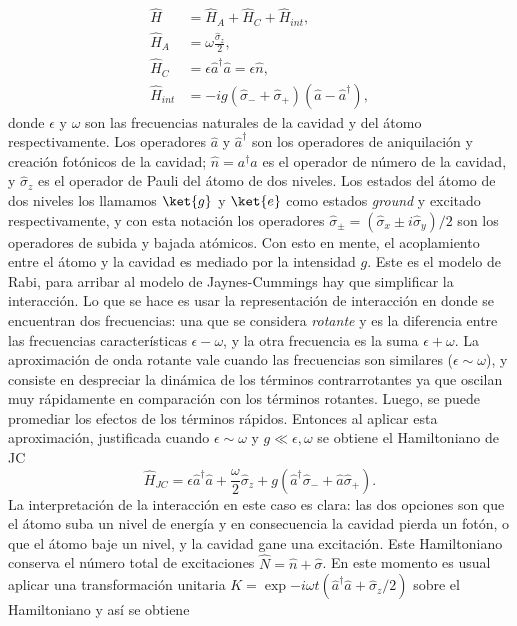 \begin{equation}\label{ec3:hamiltoniano inicial}
\begin{aligned}
    \hat H & = \hat H_A + \hat H_C + \hat H_{int},  \\
    \hat H_A &= \omega \frac{\hat \sigma_z}{2}, \\
    \hat H_C &= \epsilon \hat a^\dagger\hat a = \epsilon \hat n, \\
    \hat H_{int} &= -i g (\hat\sigma_-+\hat \sigma_+)(\hat a - \hat a^\dagger),
\end{aligned}
\end{equation}
donde $\epsilon$ y $\omega$ son las frecuencias naturales de la cavidad y del átomo respectivamente. Los operadores $\hat a$ y $\hat a^\dagger$ son los operadores de aniquilaci\'on y creaci\'on fot\'onicos de la cavidad; $\hat n =a^\dagger a$ es el operador de n\'umero de la cavidad, y $\hat \sigma_z$ es el operador de Pauli del átomo de dos niveles. Los estados del átomo de dos niveles los llamamos $\ket{g}$ y $\ket{e}$ como estados \textit{ground} y excitado respectivamente, y con esta notación los operadores $\hat\sigma_\pm = (\hat\sigma_x\pm i\hat\sigma_y)/2$ son los operadores de subida y bajada atómicos. Con esto en mente, el acoplamiento entre el átomo y la cavidad es mediado por la intensidad $g$. Este es el modelo de Rabi, para arribar al modelo de Jaynes-Cummings hay que simplificar la interacción. Lo que se hace es usar la representaci\'on de interacci\'on en donde se encuentran dos frecuencias: una que se considera \textit{rotante} y es la diferencia entre las frecuencias características $\epsilon-\omega$, y la otra frecuencia es la suma $\epsilon+\omega$. La aproximación de onda rotante vale cuando las frecuencias son similares ($\epsilon\sim\omega$), y consiste en despreciar la dinámica de los términos contrarrotantes ya que oscilan muy rápidamente en comparación con los términos rotantes. Luego, se puede promediar los efectos de los términos rápidos. Entonces al aplicar esta aproximación, justificada cuando $\epsilon\sim\omega$ y $g \ll \epsilon,\omega$ se obtiene el Hamiltoniano de JC \cite{JCoriginal}
\begin{equation}
    \hat H_{JC}=\epsilon \hat a^\dagger \hat a + \frac{\omega}{2} \hat\sigma_z + g(\hat a^\dagger\hat\sigma_-+\hat a\hat\sigma_+).
\end{equation} 
La interpretaci\'on de la interacci\'on en este caso es clara: las dos opciones son que el átomo suba un nivel de energ\'ia y en consecuencia la cavidad pierda un fot\'on, o que el átomo baje un nivel, y la cavidad gane una excitaci\'on. Este Hamiltoniano conserva el n\'umero total de excitaciones $\hat N= \hat n + \hat \sigma$. En este momento es usual aplicar una transformación unitaria $K=\exp{-i\omega t(\hat a ^\dagger \hat a + \hat \sigma_z/2)}$ sobre el Hamiltoniano y así se obtiene
